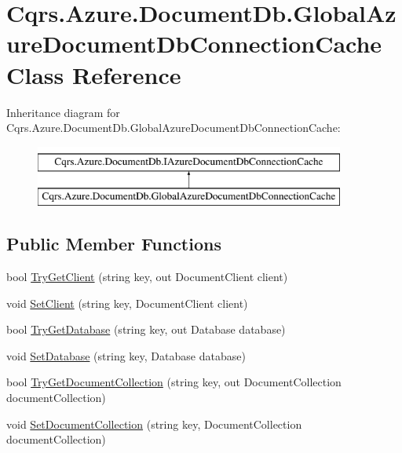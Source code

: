 \hypertarget{classCqrs_1_1Azure_1_1DocumentDb_1_1GlobalAzureDocumentDbConnectionCache}{}\section{Cqrs.\+Azure.\+Document\+Db.\+Global\+Azure\+Document\+Db\+Connection\+Cache Class Reference}
\label{classCqrs_1_1Azure_1_1DocumentDb_1_1GlobalAzureDocumentDbConnectionCache}
Inheritance diagram for Cqrs.\+Azure.\+Document\+Db.\+Global\+Azure\+Document\+Db\+Connection\+Cache\+:\begin{figure}[H]
\begin{center}
\leavevmode
\includegraphics[height=2.000000cm]{classCqrs_1_1Azure_1_1DocumentDb_1_1GlobalAzureDocumentDbConnectionCache}
\end{center}
\end{figure}
\subsection*{Public Member Functions}
\begin{DoxyCompactItemize}
\item 
bool \hyperlink{classCqrs_1_1Azure_1_1DocumentDb_1_1GlobalAzureDocumentDbConnectionCache_a5b91ecf67ee594a0a6a4d3193f381c6e}{Try\+Get\+Client} (string key, out Document\+Client client)
\item 
void \hyperlink{classCqrs_1_1Azure_1_1DocumentDb_1_1GlobalAzureDocumentDbConnectionCache_a4fbca6dadf7b2d1ffa753d755982820b}{Set\+Client} (string key, Document\+Client client)
\item 
bool \hyperlink{classCqrs_1_1Azure_1_1DocumentDb_1_1GlobalAzureDocumentDbConnectionCache_afa1518eacc7e71308bfe3ef27631da45}{Try\+Get\+Database} (string key, out Database database)
\item 
void \hyperlink{classCqrs_1_1Azure_1_1DocumentDb_1_1GlobalAzureDocumentDbConnectionCache_a1684f60eabfa556929fc264e0192906b}{Set\+Database} (string key, Database database)
\item 
bool \hyperlink{classCqrs_1_1Azure_1_1DocumentDb_1_1GlobalAzureDocumentDbConnectionCache_a9b178e41d62c9ebcfd8936418d5de009}{Try\+Get\+Document\+Collection} (string key, out Document\+Collection document\+Collection)
\item 
void \hyperlink{classCqrs_1_1Azure_1_1DocumentDb_1_1GlobalAzureDocumentDbConnectionCache_a19c4bcbf0149036557fb8a3a3b687c79}{Set\+Document\+Collection} (string key, Document\+Collection document\+Collection)
\end{DoxyCompactItemize}

